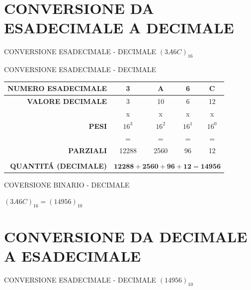 \documentclass[aspectratio=1610]{beamer}
\begin{document}
\section{CONVERSIONE DA ESADECIMALE A DECIMALE}

\begin{frame}{CONVERSIONE ESADECIMALE - DECIMALE}
    \centering
    \huge
    $(3A6C)_{16}$
\end{frame}

\begin{frame}{CONVERSIONE ESADECIMALE - DECIMALE}
\centering
    \begin{tabular}{r||c|c|c|c}
        \textbf{NUMERO ESADECIMALE} & 3 & \textbf{A} & 6 & \textbf{C} \\
        \hline
        \pause
        \textbf{VALORE DECIMALE} & 3 & 10 & 6 & 12 \\
        \hline
        \pause
         & x & x & x & x \\
        \hline
         \textbf{PESI} & $16^3$ & $16^2$ & $16^1$ & $16^0$ \\
        \hline
         & = & = & = & = \\
        \hline
        \pause
        \textbf{PARZIALI} & 12288 & 2560 & 96 & 12 \\
        \\
        \hline
        \pause
        \textbf{QUANTIT\'A (DECIMALE)} & \multicolumn{4}{c}{$\mathbf{12288 + 2560 + 96 + 12 = 14956}$} \\
    \end{tabular}
    \pause
    \begin{alertblock}{COVERSIONE BINARIO - DECIMALE}
        \begin{minipage}{0.98\linewidth}
            \centering
            \huge
            $(3A6C)_{16} = (14956)_{10}$
        \end{minipage}
    \end{alertblock}
\end{frame}

\section{CONVERSIONE DA DECIMALE A ESADECIMALE}

\begin{frame}{CONVERSIONE ESADECIMALE - DECIMALE}
    \centering
    \huge
    $(14956)_{10}$
\end{frame}
\end{document}

